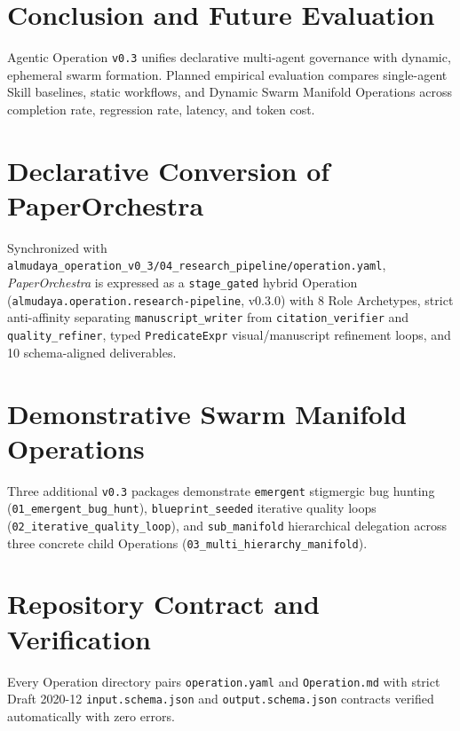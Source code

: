 \documentclass[11pt,a4paper]{article}
\begin{document}
\section{Conclusion and Future Evaluation}
Agentic Operation \texttt{v0.3} unifies declarative multi-agent governance with dynamic, ephemeral swarm formation. Planned empirical evaluation compares single-agent Skill baselines, static workflows, and Dynamic Swarm Manifold Operations across completion rate, regression rate, latency, and token cost.




\appendix
\section{Declarative Conversion of PaperOrchestra}
Synchronized with \texttt{almudaya\_operation\_v0\_3/04\_research\_pipeline/operation.yaml}, \emph{PaperOrchestra} \cite{song2026paperorchestra} is expressed as a \texttt{stage\_gated} hybrid Operation (\texttt{almudaya.operation.research-pipeline}, v0.3.0) with 8 Role Archetypes, strict anti-affinity separating \texttt{manuscript\_writer} from \texttt{citation\_verifier} and \texttt{quality\_refiner}, typed \texttt{PredicateExpr} visual/manuscript refinement loops, and 10 schema-aligned deliverables.

\section{Demonstrative Swarm Manifold Operations}
Three additional \texttt{v0.3} packages demonstrate \texttt{emergent} stigmergic bug hunting (\texttt{01\_emergent\_bug\_hunt}), \texttt{blueprint\_seeded} iterative quality loops (\texttt{02\_iterative\_quality\_loop}), and \texttt{sub\_manifold} hierarchical delegation across three concrete child Operations (\texttt{03\_multi\_hierarchy\_manifold}).

\section{Repository Contract and Verification}
Every Operation directory pairs \texttt{operation.yaml} and \texttt{Operation.md} with strict Draft 2020-12 \texttt{input.schema.json} and \texttt{output.schema.json} contracts verified automatically with zero errors.
\end{document}
